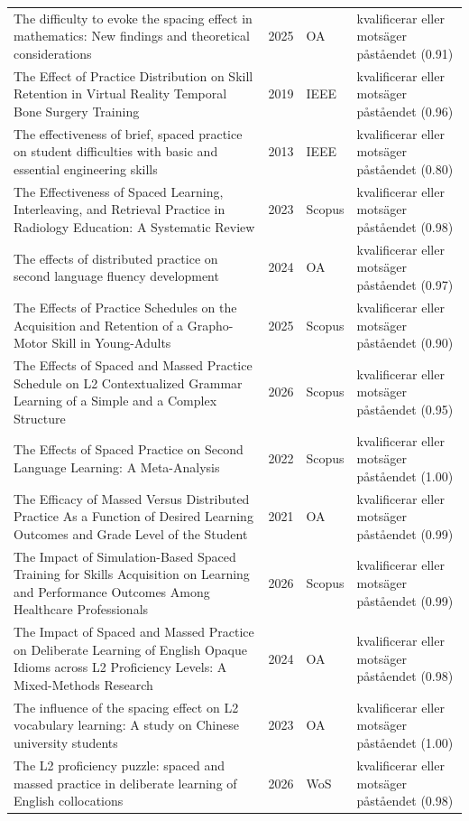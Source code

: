 \begin{longtable}{@{}%
  >{\raggedright\arraybackslash}p{}c%
  >{\raggedright\arraybackslash}p{}%
  >{\raggedright\arraybackslash}p{}@{}}
The difficulty to evoke the spacing effect in mathematics: New findings and theoretical considerations & 2025 & OA & kvalificerar eller motsäger påståendet (0.91) \\
The Effect of Practice Distribution on Skill Retention in Virtual Reality Temporal Bone Surgery Training & 2019 & IEEE & kvalificerar eller motsäger påståendet (0.96) \\
The effectiveness of brief, spaced practice on student difficulties with basic and essential engineering skills & 2013 & IEEE & kvalificerar eller motsäger påståendet (0.80) \\
The Effectiveness of Spaced Learning, Interleaving, and Retrieval Practice in Radiology Education: A Systematic Review & 2023 & Scopus & kvalificerar eller motsäger påståendet (0.98) \\
The effects of distributed practice on second language fluency development & 2024 & OA & kvalificerar eller motsäger påståendet (0.97) \\
The Effects of Practice Schedules on the Acquisition and Retention of a Grapho-Motor Skill in Young-Adults & 2025 & Scopus & kvalificerar eller motsäger påståendet (0.90) \\
The Effects of Spaced and Massed Practice Schedule on L2 Contextualized Grammar Learning of a Simple and a Complex Structure & 2026 & Scopus & kvalificerar eller motsäger påståendet (0.95) \\
The Effects of Spaced Practice on Second Language Learning: A Meta-Analysis & 2022 & Scopus & kvalificerar eller motsäger påståendet (1.00) \\
The Efficacy of Massed Versus Distributed Practice As a Function of Desired Learning Outcomes and Grade Level of the Student & 2021 & OA & kvalificerar eller motsäger påståendet (0.99) \\
The Impact of Simulation-Based Spaced Training for Skills Acquisition on Learning and Performance Outcomes Among Healthcare Professionals & 2026 & Scopus & kvalificerar eller motsäger påståendet (0.99) \\
The Impact of Spaced and Massed Practice on Deliberate Learning of English Opaque Idioms across L2 Proficiency Levels: A Mixed-Methods Research & 2024 & OA & kvalificerar eller motsäger påståendet (0.98) \\
The influence of the spacing effect on L2 vocabulary learning: A study on Chinese university students & 2023 & OA & kvalificerar eller motsäger påståendet (1.00) \\
The L2 proficiency puzzle: spaced and massed practice in deliberate learning of English collocations & 2026 & WoS & kvalificerar eller motsäger påståendet (0.98) \\

\end{longtable}
